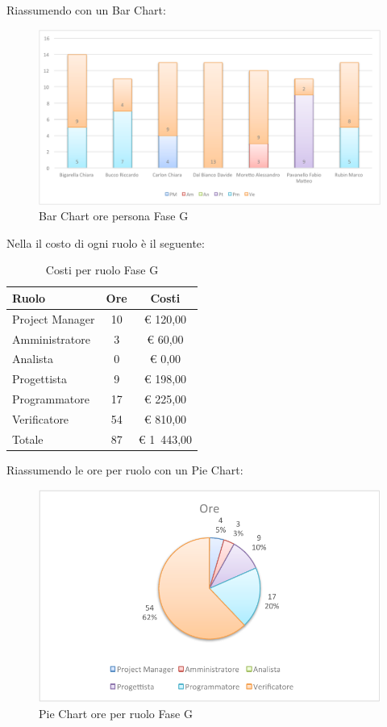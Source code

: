 				Riassumendo con un Bar Chart:
				\begin{figure}[H]\centering
					\includegraphics[width=\textwidth]{PianoDiProgetto/Pics/ChartOreFaseG.pdf}
					\caption{Bar Chart ore persona Fase G}
				\end{figure}
				Nella  il costo di ogni ruolo è il seguente:
				\begin{table}[H]
					\begin{center}
						\begin{tabular}{| l | c | c |}
							\hline
							Ruolo 				& Ore 		& Costi  \\ \hline
							
							Project Manager		& 10 		& \euro{} 120,00 	\\
							Amministratore 		& 3 		& \euro{} 60,00 	\\
							Analista	 		& 0			& \euro{} 0,00	\\
							Progettista 		& 9 		& \euro{} 198,00  	\\
							Programmatore		& 17 		& \euro{} 225,00 	\\
							Verificatore		& 54 		& \euro{} 810,00 	\\ \hline \hline
							
							Totale	 			& 87 		& \euro{} 1~443,00 	\\ \hline
						\end{tabular}
					\end{center}
					\caption{Costi per ruolo Fase G}
				\end{table}
				Riassumendo le ore per ruolo con un Pie Chart:
				\begin{figure}[H]\centering
					\includegraphics[width=\textwidth]{PianoDiProgetto/Pics/ChartTotOreFaseG.pdf}
					\caption{Pie Chart ore per ruolo Fase G}
				\end{figure}
